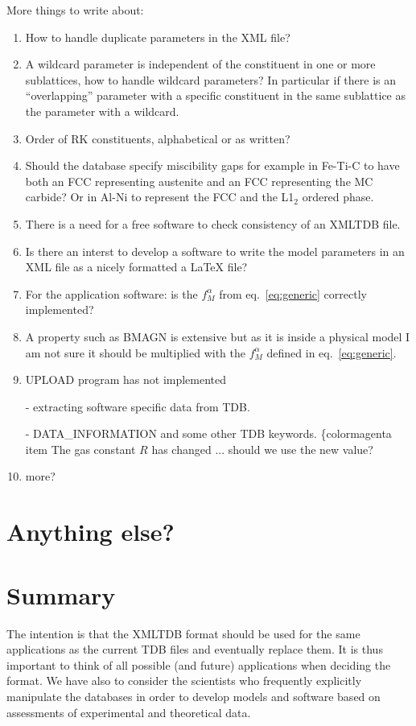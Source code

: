 \documentclass[12pt]{article}
\begin{document}
More things to write about:
\begin{enumerate}
\item How to handle duplicate parameters in the XML file?
\item A wildcard parameter is independent of the constituent in one or
  more sublattices, how to handle wildcard parameters?  In particular
  if there is an ``overlapping'' parameter with a specific constituent
  in the same sublattice as the parameter with a wildcard.
\item Order of RK constituents, alphabetical or as written?
\item Should the database specify miscibility gaps for example in
  Fe-Ti-C to have both an FCC representing austenite and an FCC
  representing the MC carbide?  Or in Al-Ni to represent the FCC and
  the L1$_2$ ordered phase.
\item There is a need for a free software to check consistency of an
  XMLTDB file.
\item Is there an interst to develop a software to write the model
  parameters in an XML file as a nicely formatted a LaTeX file?
\item For the application software: is the $f^{\alpha}_M$ from
  eq.~\ref{eq:generic} correctly implemented?
\item A property such as BMAGN is extensive but as it is inside a
  physical model I am not sure it should be multiplied with the
  $f^{\alpha}_M$ defined in eq.~\ref{eq:generic}.
\item UPLOAD program has not implemented

  - extracting software specific data from TDB.

  - DATA\_INFORMATION and some other TDB keywords.
{\{color{magenta} 
item The gas constant $R$ has changed ... should we use the new value?}
\item more?
\end{enumerate}


\section{Anything else?}

\section{Summary}

The intention is that the XMLTDB format should be used for the same
applications as the current TDB files and eventually replace them.  It
is thus important to think of all possible (and future) applications
when deciding the format.  We have also to consider the scientists who
frequently explicitly manipulate the databases in order to develop
models and software based on assessments of experimental and
theoretical data.
\end{document}
